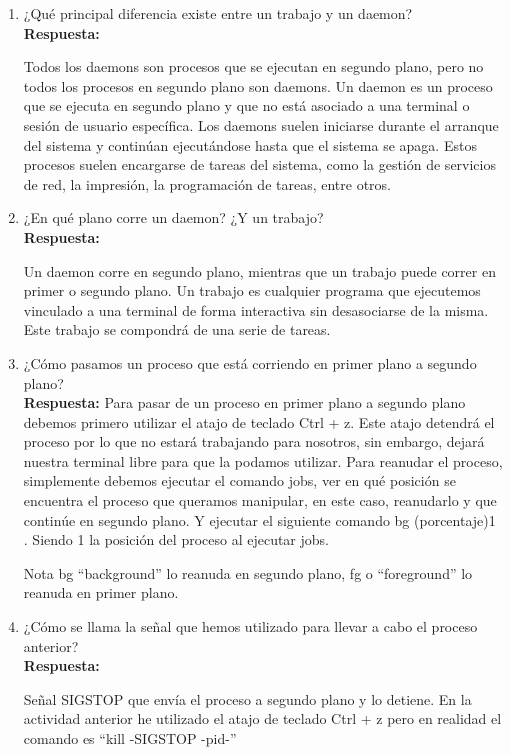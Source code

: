 \documentclass[a4paper,12pt]{article}
\begin{document}
\begin{enumerate}[label=\textbf{Pregunta \arabic*.}]
    \item ¿Qué principal diferencia existe entre un trabajo y un daemon? \\ %
    \textbf{Respuesta:} 
    
    Todos los daemons son procesos que se ejecutan en segundo plano, pero no todos los procesos en segundo plano son daemons. Un daemon es un proceso que se ejecuta en segundo plano y que no está asociado a una terminal o sesión de usuario específica. Los daemons suelen iniciarse durante el arranque del sistema y continúan ejecutándose hasta que el sistema se apaga. Estos procesos suelen encargarse de tareas del sistema, como la gestión de servicios de red, la impresión, la programación de tareas, entre otros.


    \item ¿En qué plano corre un daemon? ¿Y un trabajo? \\ %
    \textbf{Respuesta:} 
    
    Un daemon corre en segundo plano, mientras que un trabajo puede correr en primer o segundo plano. Un trabajo es cualquier programa que ejecutemos vinculado a una terminal de forma interactiva sin desasociarse de la misma. Este trabajo se compondrá de una serie de tareas. 
    \newpage

    \item ¿Cómo pasamos un proceso que está corriendo en primer plano a segundo plano? \\ %
    \textbf{Respuesta:} 
    Para pasar de un proceso en primer plano a segundo plano debemos primero utilizar el atajo de teclado Ctrl + z. Este atajo detendrá el proceso por lo que no estará trabajando para nosotros, sin embargo, dejará nuestra terminal libre para que la podamos utilizar. Para reanudar el proceso, simplemente debemos ejecutar el comando jobs, ver en qué posición se encuentra el proceso que queramos manipular, en este caso, reanudarlo y que continúe en segundo plano. Y ejecutar el siguiente comando bg (porcentaje)1 . Siendo 1 la posición del proceso al ejecutar jobs.


    Nota bg “background” lo reanuda en segundo plano, fg o “foreground” lo reanuda en primer plano.


    \item ¿Cómo se llama la señal que hemos utilizado para llevar a cabo el proceso anterior? \\
    \textbf{Respuesta:} %

    Señal SIGSTOP que envía el proceso a segundo plano y lo detiene. En la actividad anterior he utilizado el atajo de teclado Ctrl + z pero en realidad el comando es “kill -SIGSTOP -pid-”




\end{enumerate}
\end{document}
